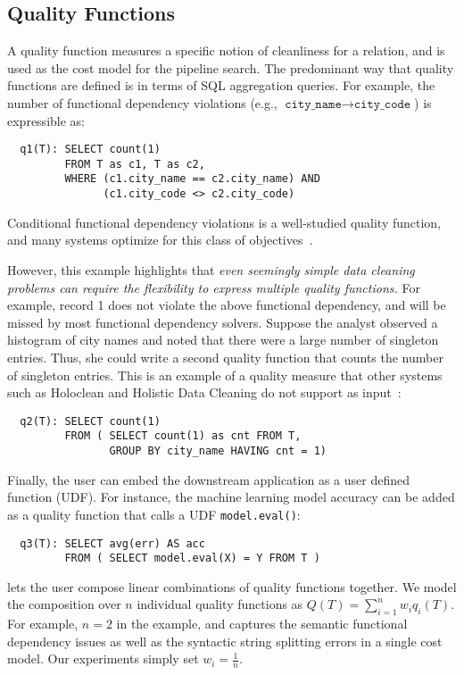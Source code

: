 


\subsection{Quality Functions}

A quality function measures a specific notion of cleanliness for a relation, and is used as the cost model for the pipeline search.  The predominant way that quality functions are defined is in terms of SQL aggregation queries. For example, the number of functional dependency violations (e.g., $\texttt{city\_name} \rightarrow \texttt{city\_code}$) is expressible as:
{\small\begin{lstlisting}
  q1(T): SELECT count(1)
         FROM T as c1, T as c2,
         WHERE (c1.city_name == c2.city_name) AND
               (c1.city_code <> c2.city_code)
\end{lstlisting}}
\noindent Conditional functional dependency violations is a well-studied quality function, and many systems optimize for this class of objectives~\cite{rekatsinas2017holoclean,DBLP:conf/sigmod/ChuIKW16}.   

However, this example highlights that \emph{even seemingly simple data cleaning problems can require the flexibility to express multiple quality functions.}   For example, record 1 does not violate the above functional dependency, and will be missed by most functional dependency solvers.  Suppose the analyst observed a histogram of city names and noted that there were a large number of singleton entries. Thus, she could write a second quality function that counts the number of singleton entries.  This is an example of a quality measure that other systems such as Holoclean and Holistic Data Cleaning do not support as input~\cite{rekatsinas2017holoclean,DBLP:conf/sigmod/ChuIKW16}:
{\small
\begin{lstlisting}
  q2(T): SELECT count(1)
         FROM ( SELECT count(1) as cnt FROM T,
                GROUP BY city_name HAVING cnt = 1)
\end{lstlisting}}
Finally, the user can embed the downstream application as a user defined function (UDF).  For instance, the machine learning model accuracy can be added as a quality function that calls a UDF \texttt{model.eval()}:
{\small\begin{lstlisting}
  q3(T): SELECT avg(err) AS acc
         FROM ( SELECT model.eval(X) = Y FROM T )
\end{lstlisting}}
\noindent \sys lets the user compose linear combinations of quality functions together. We model the composition over $n$ individual quality functions as $Q(T) = \sum_{i=1}^n w_iq_i(T)$.  For example, $n=2$ in the example, and captures the semantic functional dependency issues as well as the syntactic string splitting errors in a single cost model.  Our experiments simply set $w_i=\frac{1}{n}$.

